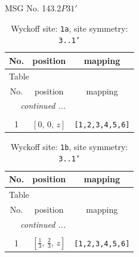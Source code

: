 \documentclass[fleqn,8pt]{jsarticle}
\begin{document}
\setcounter{MaxMatrixCols}{32}

\renewcommand{\tablename}{Table~}
\renewcommand{\figurename}{Figure~}
\begin{center}
\LARGE
MSG No. 143.2\quad$P31'$
\end{center}
\renewcommand{\arraystretch}{1.2}
\begin{longtable}{ccc}
\caption{Wyckoff site: {\tt 1a}, site symmetry: {\tt 3..1'}}
 \\
 \hline \hline
No. & position & mapping \\ \hline \endfirsthead

\multicolumn{2}{l}{\tablename\ \thetable{}} \\
 \hline \hline
No. & position & mapping \\ \hline \endhead

 \hline \hline
\multicolumn{2}{r}{\footnotesize\it continued ...} \\ \endfoot

 \hline \hline
\multicolumn{2}{r}{} \\ \endlastfoot

1 & $\left[ 0,\, 0,\, z \right]$ & {\tt [1,2,3,4,5,6]} \\
\end{longtable}
\renewcommand{\arraystretch}{1.2}
\begin{longtable}{ccc}
\caption{Wyckoff site: {\tt 1b}, site symmetry: {\tt 3..1'}}
 \\
 \hline \hline
No. & position & mapping \\ \hline \endfirsthead

\multicolumn{2}{l}{\tablename\ \thetable{}} \\
 \hline \hline
No. & position & mapping \\ \hline \endhead

 \hline \hline
\multicolumn{2}{r}{\footnotesize\it continued ...} \\ \endfoot

 \hline \hline
\multicolumn{2}{r}{} \\ \endlastfoot

1 & $\left[ \frac{1}{3},\, \frac{2}{3},\, z \right]$ & {\tt [1,2,3,4,5,6]} \\
\end{longtable}
\renewcommand{\arraystretch}{1.2}
\end{document}
